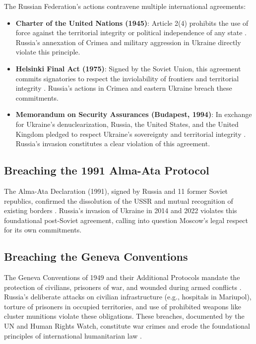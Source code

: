 \documentclass[a4paper,12pt]{article}
\begin{document}
The Russian Federation’s actions contravene multiple international agreements:
\begin{itemize}
    \item \textbf{Charter of the United Nations (1945)}: Article 2(4) prohibits the use of force against the territorial integrity or political independence of any state \cite{un_charter}. Russia’s annexation of Crimea and military aggression in Ukraine directly violate this principle.
    \item \textbf{Helsinki Final Act (1975)}: Signed by the Soviet Union, this agreement commits signatories to respect the inviolability of frontiers and territorial integrity \cite{helsinki_1975}. Russia’s actions in Crimea and eastern Ukraine breach these commitments.
    \item \textbf{Memorandum on Security Assurances (Budapest, 1994)}: In exchange for Ukraine’s denuclearization, Russia, the United States, and the United Kingdom pledged to respect Ukraine’s sovereignty and territorial integrity \cite{budapest_1994}. Russia’s invasion constitutes a clear violation of this agreement.
\end{itemize}

\subsection{Breaching the 1991 Alma-Ata Protocol}
The Alma-Ata Declaration (1991), signed by Russia and 11 former Soviet republics, confirmed the dissolution of the USSR and mutual recognition of existing borders \cite{alma_ata_1991}. Russia’s invasion of Ukraine in 2014 and 2022 violates this foundational post-Soviet agreement, calling into question Moscow’s legal respect for its own commitments.

\subsection{Breaching the Geneva Conventions}
The Geneva Conventions of 1949 and their Additional Protocols mandate the protection of civilians, prisoners of war, and wounded during armed conflicts \cite{geneva_1949}. Russia’s deliberate attacks on civilian infrastructure (e.g., hospitals in Mariupol), torture of prisoners in occupied territories, and use of prohibited weapons like cluster munitions violate these obligations. These breaches, documented by the UN and Human Rights Watch, constitute war crimes and erode the foundational principles of international humanitarian law \cite{un_inquiry_2023, hrw_2023}.
\end{document}
